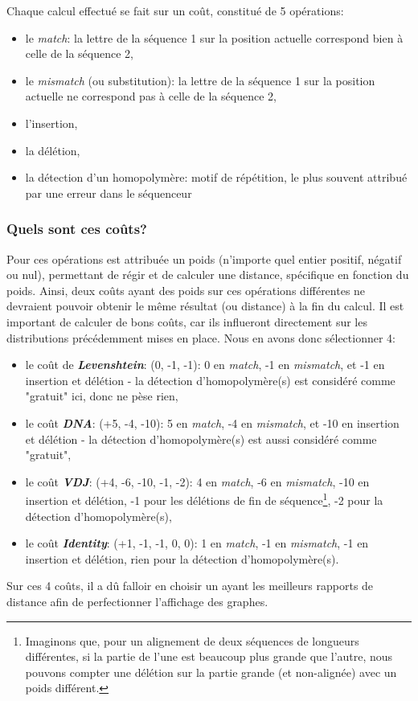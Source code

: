 \documentclass[12pt]{report}
\begin{document}
\begin{spacing}{1.2}
Chaque calcul effectué se fait sur un coût, constitué de 5 opérations:
\begin{itemize}
\item{le \textit{match}: la lettre de la séquence 1 sur la position actuelle correspond bien à celle de la séquence 2,}
\item{le \textit{mismatch} (ou substitution): la lettre de la séquence 1 sur la position actuelle ne correspond pas à celle de la séquence 2,}
\item{l'insertion,}
\item{la délétion,}
\item{la détection d'un homopolymère: motif de répétition, le plus souvent attribué par une erreur dans le séquenceur}
\end{itemize}

\subsubsection{Quels sont ces coûts?}

Pour ces opérations est attribuée un poids (n'importe quel entier positif, négatif ou nul), permettant de régir et de calculer une distance, spécifique en fonction du poids.
\newline
Ainsi, deux coûts ayant des poids sur ces opérations différentes ne devraient pouvoir obtenir le même résultat (ou distance) à la fin du calcul.
\newline
Il est important de calculer de bons coûts, car ils influeront directement sur les distributions précédemment mises en place. Nous en avons donc sélectionner 4:
\begin{itemize}
\item{le coût de \textbf{\textit{Levenshtein}}: (0, -1, -1): 0 en \textit{match}, -1 en \textit{mismatch}, et -1 en insertion et délétion - la détection d'homopolymère(s) est considéré comme "gratuit" ici, donc ne pèse rien,}
\item{le coût \textbf{\textit{DNA}}: (+5, -4, -10): 5 en \textit{match}, -4 en \textit{mismatch}, et -10 en insertion et délétion - la détection d'homopolymère(s) est aussi considéré comme "gratuit",}
\item{le coût \textbf{\textit{VDJ}}: (+4, -6, -10, -1, -2): 4 en \textit{match}, -6 en \textit{mismatch}, -10 en insertion et délétion, -1 pour les délétions de fin de séquence\footnote{Imaginons que, pour un alignement de deux séquences de longueurs différentes, si la partie de l'une est beaucoup plus grande que l'autre, nous pouvons compter une délétion sur la partie grande (et non-alignée) avec un poids différent.}, -2 pour la détection d'homopolymère(s),}
\item{le coût \textbf{\textit{Identity}}: (+1, -1, -1, 0, 0): 1 en \textit{match}, -1 en \textit{mismatch}, -1 en insertion et délétion, rien pour la détection d'homopolymère(s).}
\end{itemize}
Sur ces 4 coûts, il a dû falloir en choisir un ayant les meilleurs rapports de distance afin de perfectionner l'affichage des graphes.


\end{spacing}
\end{document}
